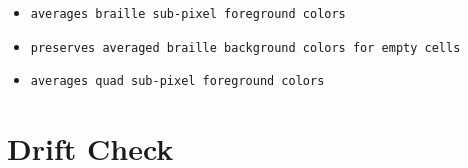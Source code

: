 \begin{itemize}
\tightlist
\item
  \texttt{a\allowbreak{}v\allowbreak{}e\allowbreak{}r\allowbreak{}a\allowbreak{}g\allowbreak{}e\allowbreak{}s\allowbreak{} \allowbreak{}b\allowbreak{}r\allowbreak{}a\allowbreak{}i\allowbreak{}l\allowbreak{}l\allowbreak{}e\allowbreak{} \allowbreak{}s\allowbreak{}u\allowbreak{}b\allowbreak{}-\allowbreak{}p\allowbreak{}i\allowbreak{}x\allowbreak{}e\allowbreak{}l\allowbreak{} \allowbreak{}f\allowbreak{}o\allowbreak{}r\allowbreak{}e\allowbreak{}g\allowbreak{}r\allowbreak{}o\allowbreak{}u\allowbreak{}n\allowbreak{}d\allowbreak{} \allowbreak{}c\allowbreak{}o\allowbreak{}l\allowbreak{}o\allowbreak{}r\allowbreak{}s}
\item
  \texttt{p\allowbreak{}r\allowbreak{}e\allowbreak{}s\allowbreak{}e\allowbreak{}r\allowbreak{}v\allowbreak{}e\allowbreak{}s\allowbreak{} \allowbreak{}a\allowbreak{}v\allowbreak{}e\allowbreak{}r\allowbreak{}a\allowbreak{}g\allowbreak{}e\allowbreak{}d\allowbreak{} \allowbreak{}b\allowbreak{}r\allowbreak{}a\allowbreak{}i\allowbreak{}l\allowbreak{}l\allowbreak{}e\allowbreak{} \allowbreak{}b\allowbreak{}a\allowbreak{}c\allowbreak{}k\allowbreak{}g\allowbreak{}r\allowbreak{}o\allowbreak{}u\allowbreak{}n\allowbreak{}d\allowbreak{} \allowbreak{}c\allowbreak{}o\allowbreak{}l\allowbreak{}o\allowbreak{}r\allowbreak{}s\allowbreak{} \allowbreak{}f\allowbreak{}o\allowbreak{}r\allowbreak{} \allowbreak{}e\allowbreak{}m\allowbreak{}p\allowbreak{}t\allowbreak{}y\allowbreak{} \allowbreak{}c\allowbreak{}e\allowbreak{}l\allowbreak{}l\allowbreak{}s}
\item
  \texttt{a\allowbreak{}v\allowbreak{}e\allowbreak{}r\allowbreak{}a\allowbreak{}g\allowbreak{}e\allowbreak{}s\allowbreak{} \allowbreak{}q\allowbreak{}u\allowbreak{}a\allowbreak{}d\allowbreak{} \allowbreak{}s\allowbreak{}u\allowbreak{}b\allowbreak{}-\allowbreak{}p\allowbreak{}i\allowbreak{}x\allowbreak{}e\allowbreak{}l\allowbreak{} \allowbreak{}f\allowbreak{}o\allowbreak{}r\allowbreak{}e\allowbreak{}g\allowbreak{}r\allowbreak{}o\allowbreak{}u\allowbreak{}n\allowbreak{}d\allowbreak{} \allowbreak{}c\allowbreak{}o\allowbreak{}l\allowbreak{}o\allowbreak{}r\allowbreak{}s}
\end{itemize}

\section{Drift Check}\label{record-158-drift-check}

